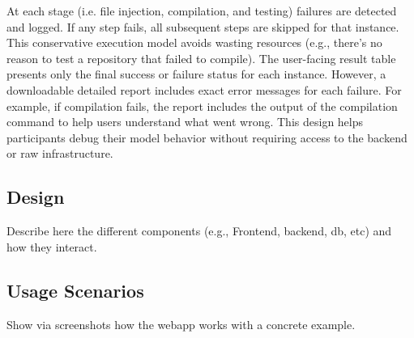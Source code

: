 At each stage (i.e. file injection, compilation, and testing) failures are detected and logged. If
any step fails, all subsequent steps are skipped for that instance. This conservative execution
model avoids wasting resources (e.g., there's no reason to test a repository that failed to
compile). The user-facing result table presents only the final success or failure status for each
instance. However, a downloadable detailed report includes exact error messages for each failure.
For example, if compilation fails, the report includes the output of the compilation command to help
users understand what went wrong. This design helps participants debug their model behavior without
requiring access to the backend or raw infrastructure.

\subsection{Design}

{\color{gray} Describe here the different components (e.g., Frontend, backend, db, etc) and how they
	interact.}

\subsection{Usage Scenarios}

{\color{gray} Show via screenshots how the webapp works with a concrete example.}
\label{sec:refinement} %
\label{sec:paraphrases-check} %
